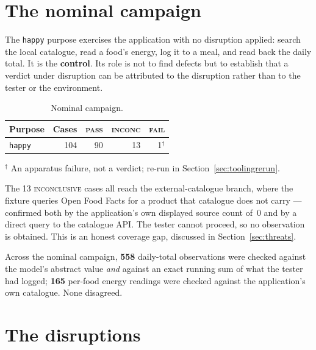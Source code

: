 \documentclass[11pt,a4paper]{article}
\newcommand{\gate}[1]{\texttt{\small #1}}
\begin{document}
\section{The nominal campaign}

The \gate{happy} purpose exercises the application with no disruption applied:
search the local catalogue, read a food's energy, log it to a meal, and read back
the daily total. It is the \textbf{control}. Its role is not to find defects but
to establish that a verdict under disruption can be attributed to the disruption
rather than to the tester or the environment.

\begin{table}[h]
\centering\small
\caption{Nominal campaign.}
\begin{tabular}{@{}lrrrr@{}}
\toprule
Purpose & Cases & \textsc{pass} & \textsc{inconc} & \textsc{fail} \\
\midrule
\gate{happy} & 104 & 90 & 13 & 1$^{\dagger}$ \\
\bottomrule
\end{tabular}
\end{table}

\noindent $^{\dagger}$ An apparatus failure, not a verdict; re-run in
Section~\ref{sec:toolingrerun}.

\noindent The 13 \textsc{inconclusive} cases all reach the external-catalogue
branch, where the fixture queries Open Food Facts for a product that catalogue
does not carry --- confirmed both by the application's own displayed source count
of~0 and by a direct query to the catalogue API. The tester cannot proceed, so no
observation is obtained. This is an honest coverage gap, discussed in
Section~\ref{sec:threats}.

Across the nominal campaign, \textbf{558} daily-total observations were checked
against the model's abstract value \emph{and} against an exact running sum of
what the tester had logged; \textbf{165} per-food energy readings were checked
against the application's own catalogue. None disagreed.

\section{The disruptions}
\end{document}
